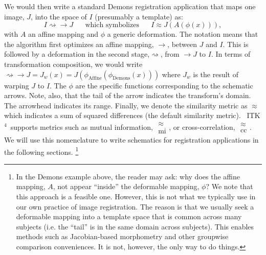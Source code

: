 \documentclass{frontiersSCNS}
\newcommand{\tk}{~ITK$^{\text{4}}$~}
\begin{document}
We would then write a standard Demons registration application that maps 
one image, $J$, into the space of $I$ (presumably a template) as:
$$
 I  \rightsquigarrow \rightarrow  J \text{~~~~~which symbolizes~~~~~} I \approx
 J( A( \phi( x ) )),
$$
with $A$ an affine mapping and $\phi$ a generic deformation. 
The notation means that the algorithm first optimizes an affine
mapping, $ \rightarrow$, 
between $J$ and $I$.  
This is followed by a deformation in the second stage,$\rightsquigarrow$, from $\rightarrow J$
to $I$.  In terms of transformation composition, we would write
$\rightsquigarrow \rightarrow  J = J_w(x) =
J( \phi_\text{Affine} ( \phi_\text{Demons} ( x) )) $ where $J_w$ is
the result of warping $J$ to $I$.  The $\phi$ are the specific
functions corresponding to the schematic arrows.  Note, also, that the
tail of the arrow indicates the transform's domain.  The arrowhead
indicates its range.  Finally, we denote the similarity metric as
$\approx$ which indicates a sum of squared differences (the default
similarity metric).  \tk supports metrics such as mutual information,
$\substack{ \approx \\ \text{mi} }$, or cross-correlation, $\substack{
\approx \\ \text{cc} }$.  We will use this nomenclature to write
schematics for registration applications in the following sections.
\footnote{In the Demons example above, the reader may ask: why does the affine
mapping, $A$, not appear ``inside'' the deformable mapping, $\phi$?
We note that this approach is a feasible one.  However, this is not
what we typically use in our own practice of image registration.  The
reason is that we usually seek a deformable mapping into a template
space that is common across many subjects (i.e. the ``tail'' is in the
same domain across subjects).  This enables methods such as
Jacobian-based morphometry and other groupwise comparison
conveniences.  It is not, however, the only way to do things.}
\end{document}
